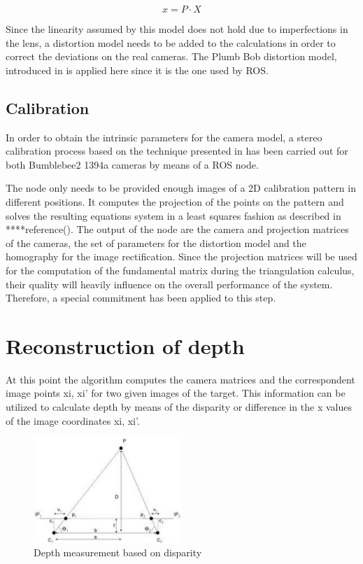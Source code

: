 \begin{equation}
x = P·X
\label{eq:pinhole_model}
\end{equation}  

Since the linearity assumed by this model does not hold due to imperfections in the lens, a distortion model needs to be added to the calculations in order to correct the deviations on the real cameras. 
The Plumb Bob distortion model, introduced in \cite{Brown} is applied here since it is the one used by ROS.

\subsection{Calibration}
In order to obtain the intrinsic parameters for the camera model, a stereo calibration process based on the technique presented in \cite{Zhang} has been carried out for both Bumblebee2 1394a cameras by means of a ROS node. 

The node only needs to be provided enough images of a 2D calibration pattern in different positions. 
It computes the projection of the points on the pattern and solves the resulting equations system in a least squares fashion as described in ****reference(). 
The output of the node are the camera and projection matrices of the cameras, the set of parameters for the distortion model and the homography for the image rectification. 
Since the projection matrices will be used for the computation of the fundamental matrix during the triangulation calculus, their quality will heavily influence on the overall performance of the system. 
Therefore, a special commitment has been applied to this step. 

\section{Reconstruction of depth}
At this point the algorithm computes the camera matrices and the correspondent image points {xi, xi'} for two given images of the target. 
This information can be utilized to calculate depth by means of the disparity or difference in the x values of the image coordinates {xi, xi'}.

\begin{figure}[h]
    \centering
    \includegraphics[width=0.5\textwidth]{images/triangulate}
    \caption{Depth measurement based on disparity}
    \label{fig:Depth_disparity}
\end{figure}

